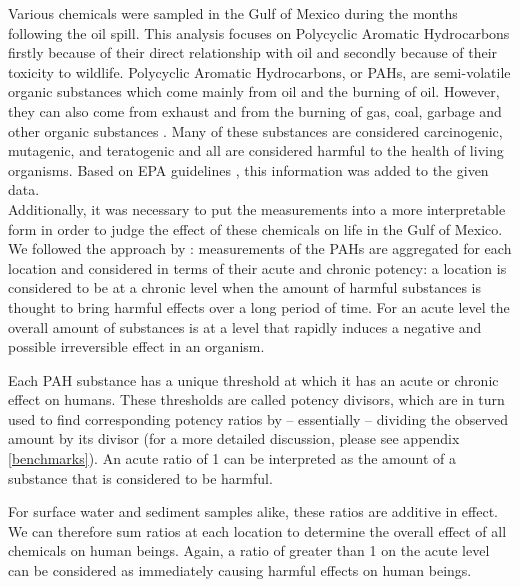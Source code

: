 \documentclass[authoryear,12pt]{elsarticle}
\begin{document}
Various chemicals were sampled in the Gulf of Mexico during the months following the oil spill. This analysis focuses on Polycyclic Aromatic Hydrocarbons firstly because of their direct relationship with oil and secondly because of their toxicity to wildlife. Polycyclic Aromatic Hydrocarbons, or PAHs, are semi-volatile organic substances which come mainly from oil and the burning of oil. However, they can also come from exhaust and from the burning of gas, coal, garbage and other organic substances \citep{pah}.   Many of these substances are considered carcinogenic, mutagenic, and teratogenic and all are considered harmful to the health of living organisms. Based on EPA guidelines \citep{pah},  this information  was added to the given data. \\
Additionally, it was necessary to put the measurements into a more interpretable form in order to judge the effect of these chemicals on life in the Gulf of Mexico.
 We followed the approach by \citet{pah-benchmark}: measurements of the PAHs are aggregated for each location and considered in terms of their acute and chronic potency: a location is considered to be  at a chronic level when the amount of harmful substances is thought to bring harmful effects over a long period of time. For an acute level the overall amount of substances is at a level that rapidly induces a negative and possible irreversible effect in an organism. 
 
Each PAH substance has a unique  threshold at which it has an acute or chronic effect on humans. These thresholds are called potency divisors, which are in turn  used to find corresponding potency ratios by -- essentially -- dividing the observed amount by its divisor (for a more detailed discussion, please see appendix \ref{benchmarks}). An acute ratio of 1 can be interpreted as the amount of a substance that is considered to be harmful.

For surface water and sediment samples alike, these ratios are additive in effect. We can therefore sum ratios at each location to determine the overall effect of all chemicals on human beings. Again, a ratio of greater than 1 on the acute level can be considered as immediately causing harmful effects on human beings.
\end{document}
